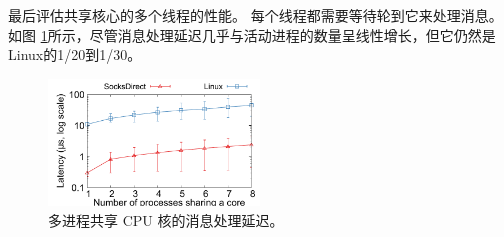 
最后评估共享核心的多个线程的性能。 每个线程都需要等待轮到它来处理消息。
如图 \ref {socksdirect:fig:eval-context-switch}所示，尽管消息处理延迟几乎与活动进程的数量呈线性增长，但它仍然是Linux的1/20到1/30。


\begin{figure}[htbp]
	
	\centering \includegraphics[width=0.5\textwidth]{eval/microbenchmark/sharecore-lat.pdf}
	
	\caption{多进程共享 CPU 核的消息处理延迟。}
	\label{socksdirect:fig:eval-context-switch}
\end{figure}


